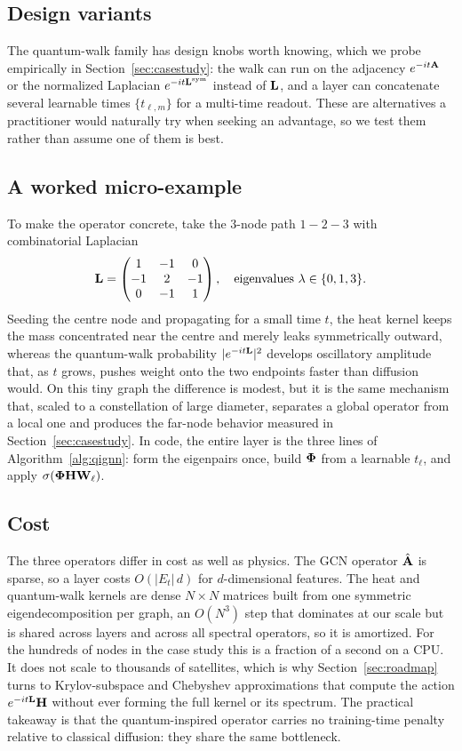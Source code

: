 

\subsection{Design variants}
The quantum-walk family has design knobs worth knowing, which we probe empirically in
Section~\ref{sec:casestudy}: the walk can run on the adjacency $e^{-it\mathbf{A}}$ or the
normalized Laplacian $e^{-it\mathbf{L}^{\mathrm{sym}}}$ instead of $\mathbf{L}$, and a layer can
concatenate several learnable times $\{t_{\ell,m}\}$ for a multi-time readout. These
are alternatives a practitioner would naturally try when seeking an advantage, so we
test them rather than assume one of them is best.

\subsection{A worked micro-example}
To make the operator concrete, take the $3$-node path $1\!-\!2\!-\!3$ with combinatorial
Laplacian
\begin{equation}
\mathbf{L}=\begin{pmatrix} 1 & -1 & 0\\ -1 & 2 & -1\\ 0 & -1 & 1\end{pmatrix},
\quad \text{eigenvalues } \lambda\in\{0,1,3\}.
\end{equation}
Seeding the centre node and propagating for a small time $t$, the heat kernel keeps the
mass concentrated near the centre and merely leaks symmetrically outward, whereas the
quantum-walk probability $|e^{-it\mathbf{L}}|^2$ develops oscillatory amplitude that, as $t$
grows, pushes weight onto the two endpoints faster than diffusion would. On this tiny
graph the difference is modest, but it is the same mechanism that, scaled to a constellation
of large diameter, separates a global operator from a local one and produces the far-node
behavior measured in Section~\ref{sec:casestudy}. In code, the entire layer is the three
lines of Algorithm~\ref{alg:qignn}: form the eigenpairs once, build $\boldsymbol{\Phi}$ from a
learnable $t_\ell$, and apply $\sigma(\boldsymbol{\Phi}\mathbf{H}\mathbf{W}_\ell)$.

\subsection{Cost}
The three operators differ in cost as well as physics. The GCN operator $\hat{\mathbf{A}}$ is
sparse, so a layer costs $O(|E_t|\,d)$ for $d$-dimensional features. The heat and
quantum-walk kernels are dense $N\times N$ matrices built from one symmetric
eigendecomposition per graph, an $O(N^3)$ step that dominates at our scale but is shared
across layers and across all spectral operators, so it is amortized. For the hundreds of
nodes in the case study this is a fraction of a second on a CPU. It does not scale to
thousands of satellites, which is why Section~\ref{sec:roadmap} turns to
Krylov-subspace and Chebyshev approximations that compute the action $e^{-it\mathbf{L}}\mathbf{H}$
without ever forming the full kernel or its spectrum. The practical takeaway is that the
quantum-inspired operator carries no training-time penalty relative to classical
diffusion: they share the same bottleneck.

